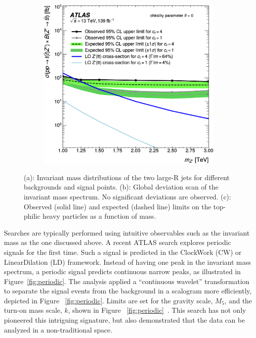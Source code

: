 \documentclass{moriond}
\begin{document}
\begin{figure}[htp]
\begin{subfigure}[b]{0.21\textwidth}
         \caption{}
         \label{fig:bump}
     \end{subfigure}
     \begin{subfigure}[b]{0.23\textwidth}
         \centering
         \includegraphics[width=\textwidth]{tttt}
         \caption{}
         \label{fig:ttttlimits}
     \end{subfigure}
        \caption{(a): Invariant mass distributions of the two large-R jets for different backgrounds and signal points. (b): Global deviation scan of the invariant mass spectrum. No significant deviations are observed. (c): Observed (solid line) and expected (dashed line) limits on the top-philic heavy particles as a function of mass\protect\cite{tttt}.}
        \label{fig:tttt}
\end{figure}

Searches are typically performed using intuitive observables such as the
invariant mass as the one discussed above. A recent ATLAS search explores
periodic signals for the first time. Such a signal is predicted in the
ClockWork (CW) or LinearDilation (LD) framework. Instead of having one peak in
the invariant mass spectrum, a periodic signal predicts continuous narrow
peaks, as illustrated in Figure~\ref{fig:periodic}. The analysis applied a
``continuous wavelet'' transformation to separate the signal events from the
background in a scalogram more efficiently, depicted in Figure
~\ref{fig:periodic}. Limits are set for the gravity scale, $M_{5}$, and the
turn-on mass scale, $k$, shown in Figure ~\ref{fig:periodic}~\cite{period}.
This search has not only pioneered this intriguing signature, but also
demonstrated that the data can be analyzed in a non-traditional space.\\        
\end{document}
